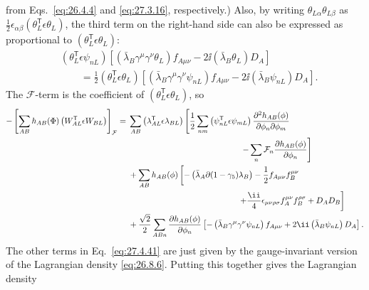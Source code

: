 from Eqs.~\eqref{eq:26.4.4} and \eqref{eq:27.3.16}, respectively.) Also, by
writing \(\theta_{L\alpha}\theta_{L\beta}\) as
\(\tfrac12\epsilon_{\alpha\beta}
(\theta_L^{\mathsf T}\epsilon\theta_L)\), the third term on the right-hand
side can also be expressed as proportional to
\((\theta_L^{\mathsf T}\epsilon\theta_L)\):
\[
  \begin{aligned}
  &\left(\theta_L^{\mathsf T}\epsilon\psi_{nL}\right)
  \left[
    \left(\bar\lambda_B\gamma^\mu\gamma^\nu\theta_L\right)f_{A\mu\nu}
    -2\ii\left(\bar\lambda_B\theta_L\right)D_A
  \right]
  \\
  &\qquad
  =\frac12\left(\theta_L^{\mathsf T}\epsilon\theta_L\right)
  \left[
    \left(\bar\lambda_B\gamma^\mu\gamma^\nu\psi_{nL}\right)f_{A\mu\nu}
    -2\ii\left(\bar\lambda_B\psi_{nL}\right)D_A
  \right].
  \end{aligned}
\]
The \(\mathcal{F}\)-term is the coefficient of
\((\theta_L^{\mathsf T}\epsilon\theta_L)\), so
\[
  \begin{aligned}
  -\left[
    \sum_{AB}h_{AB}(\Phi)
    \left(W_{AL}^{\mathsf T}\epsilon W_{BL}\right)
  \right]_{\mathcal{F}}
  ={}&
  \sum_{AB}\left(\lambda_{AL}^{\mathsf T}\epsilon\lambda_{BL}\right)
  \left[
    \frac12\sum_{nm}
      \left(\psi_{nL}^{\mathsf T}\epsilon\psi_{mL}\right)
      \frac{\partial^2h_{AB}(\phi)}
           {\partial\phi_n\partial\phi_m}
  \right.
  \\
  &\hspace{48mm}\left.
    -\sum_n\mathcal{F}_n
      \frac{\partial h_{AB}(\phi)}{\partial\phi_n}
  \right]
  \\
  &+\sum_{AB}h_{AB}(\phi)
  \left[
    -\left(\bar\lambda_A\sl{\partial}
      (1-\gamma_5)\lambda_B\right)
    -\frac12f_{A\mu\nu}f_B^{\mu\nu}
  \right.
  \\
  &\hspace{47mm}\left.
    +\frac{\ii}{4}\epsilon_{\mu\nu\rho\sigma}
      f_A^{\mu\nu}f_B^{\rho\sigma}
    +D_AD_B
  \right]
  \\
  &+\frac{\sqrt{2}}2\sum_{ABn}
  \frac{\partial h_{AB}(\phi)}{\partial\phi_n}
  \left[
    -\left(\bar\lambda_B\gamma^\mu\gamma^\nu\psi_{nL}\right)f_{A\mu\nu}
    +2\ii\left(\bar\lambda_B\psi_{nL}\right)D_A
  \right].
  \end{aligned}
\]
The other terms in Eq.~\eqref{eq:27.4.41} are just given by the
gauge-invariant version of the Lagrangian density \eqref{eq:26.8.6}. Putting
this together gives the Lagrangian density
